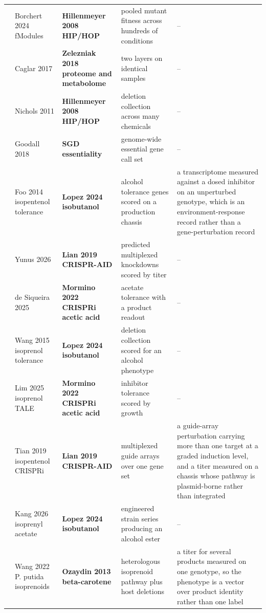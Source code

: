 \begin{landscape}
\begin{longtable}{@{}r@{\hspace{4pt}} L{40mm} L{40mm} L{74mm} L{74mm}@{}}
 & Borchert 2024 fModules  & \textbf{Hillenmeyer 2008 HIP/HOP} & pooled mutant fitness across hundreds of conditions & -- \\
 & Caglar 2017  & \textbf{Zelezniak 2018 proteome and metabolome} & two layers on identical samples & -- \\
 & Nichols 2011  & \textbf{Hillenmeyer 2008 HIP/HOP} & deletion collection across many chemicals & -- \\
 & Goodall 2018  & \textbf{SGD essentiality} & genome-wide essential gene call set & -- \\
 & Foo 2014 isopentenol tolerance  & \textbf{Lopez 2024 isobutanol} & alcohol tolerance genes scored on a production chassis & a transcriptome measured against a dosed inhibitor on an unperturbed genotype, which is an environment-response record rather than a gene-perturbation record \\
 & Yunus 2026  & \textbf{Lian 2019 CRISPR-AID} & predicted multiplexed knockdowns scored by titer & -- \\
 & de Siqueira 2025  & \textbf{Mormino 2022 CRISPRi acetic acid} & acetate tolerance with a product readout & -- \\
 & Wang 2015 isoprenol tolerance  & \textbf{Lopez 2024 isobutanol} & deletion collection scored for an alcohol phenotype & -- \\
 & Lim 2025 isoprenol TALE  & \textbf{Mormino 2022 CRISPRi acetic acid} & inhibitor tolerance scored by growth & -- \\
 & Tian 2019 isopentenol CRISPRi  & \textbf{Lian 2019 CRISPR-AID} & multiplexed guide arrays over one gene set & a guide-array perturbation carrying more than one target at a graded induction level, and a titer measured on a chassis whose pathway is plasmid-borne rather than integrated \\
 & Kang 2026 isoprenyl acetate  & \textbf{Lopez 2024 isobutanol} & engineered strain series producing an alcohol ester & -- \\
 & Wang 2022 P. putida isoprenoids  & \textbf{Ozaydin 2013 beta-carotene} & heterologous isoprenoid pathway plus host deletions & a titer for several products measured on one genotype, so the phenotype is a vector over product identity rather than one label \\

\end{longtable}
\end{landscape}
